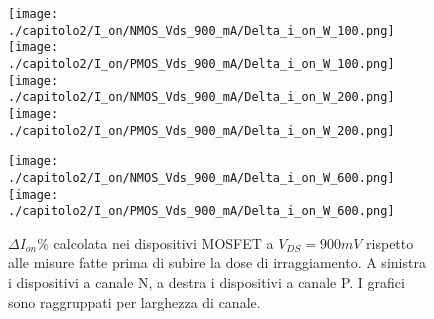 \begin{figure}[h]
    \centering
    \texttt{[image: ./capitolo2/I\_on/NMOS\_Vds\_900\_mA/Delta\_i\_on\_W\_100.png]}
    \texttt{[image: ./capitolo2/I\_on/PMOS\_Vds\_900\_mA/Delta\_i\_on\_W\_100.png]}\\
    \vspace{0.2cm}
    \texttt{[image: ./capitolo2/I\_on/NMOS\_Vds\_900\_mA/Delta\_i\_on\_W\_200.png]}
    \texttt{[image: ./capitolo2/I\_on/PMOS\_Vds\_900\_mA/Delta\_i\_on\_W\_200.png]}\\
    \vspace{0.2cm}

    \texttt{[image: ./capitolo2/I\_on/NMOS\_Vds\_900\_mA/Delta\_i\_on\_W\_600.png]}
    \texttt{[image: ./capitolo2/I\_on/PMOS\_Vds\_900\_mA/Delta\_i\_on\_W\_600.png]}

    \caption[Dati $\Delta I_{on}\%$ a $V_{DS}=440mV$ ]{$\Delta I_{on}\%$ calcolata nei dispositivi MOSFET a $V_{DS} = 900mV$ rispetto alle misure fatte prima di subire la dose di irraggiamento. A sinistra i dispositivi a canale N, a destra i dispositivi a canale P. I grafici sono raggruppati per larghezza di canale.}
    \label{fig:delta_I_on_vds_900_mv}

\end{figure}


